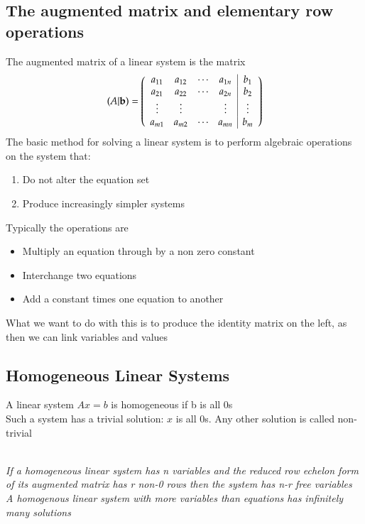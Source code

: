 \documentclass{article}[18pt]
\begin{document}
\subsection{The augmented matrix and elementary row operations}
The augmented matrix of a linear system is the matrix
$$( A | \mathbf { b } ) = \left( \begin{array} { c c c c | c } { a _ { 11 } } & { a _ { 12 } } & { \cdots } & { a _ { 1 n } } & { b _ { 1 } } \\ { a _ { 21 } } & { a _ { 22 } } & { \cdots } & { a _ { 2 n } } & { b _ { 2 } } \\ { \vdots } & { \vdots } & { } & { \vdots } & { \vdots } \\ { a _ { m 1 } } & { a _ { m 2 } } & { \cdots } & { a _ { m n } } & { b _ { m } } \end{array} \right)$$
The basic method for solving a linear system is to perform algebraic operations on the system that:
\begin{enumerate}[label=(\alph*)]
	\item Do not alter the equation set
	\item Produce increasingly simpler systems
\end{enumerate}
Typically the operations are
\begin{itemize}
	\item Multiply an equation through by a non zero constant
	\item Interchange two equations
	\item Add a constant times one equation to another
\end{itemize}
What we want to do with this is to produce the identity matrix on the left, as then we can link variables and values
\subsection{Homogeneous Linear Systems}
A linear system $Ax=b$ is homogeneous if b is all 0s\\
Such a system has a trivial solution: $x$ is all 0s. Any other solution is called non-trivial\\
\\
\begin{center}
	\textit{If a homogeneous linear system has n variables and the reduced row echelon form of its augmented matrix has r non-0 rows then the system has n-r free variables}\\
	\textit{A homogenous linear system with more variables than equations has infinitely many solutions}
\end{center}
\end{document}
